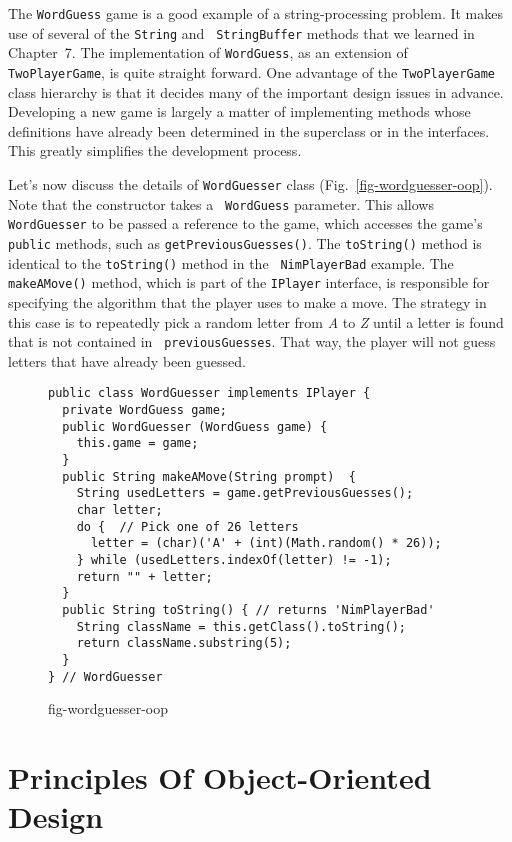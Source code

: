 The {\tt WordGuess} game is a good example of a string-processing
problem.  It makes use of several of the {\tt String} and {\tt
StringBuffer} methods that we learned in Chapter~7.  The
implementation of {\tt WordGuess}, as an extension of {\tt
TwoPlayerGame}, is quite straight forward. One advantage of
the {\tt TwoPlayerGame} class hierarchy is that it decides many
of the important design issues in advance. Developing a new game
is largely a matter of implementing methods whose definitions have
already been determined in the superclass or in the interfaces.  This
greatly simplifies the development process.

Let's now discuss the details of {\tt WordGuesser} class
(Fig.~\ref{fig-wordguesser-oop}). Note that the constructor takes a {\tt
WordGuess} parameter. This allows {\tt WordGuesser} to be passed a
reference to the game, which accesses the game's {\tt public}
methods, such as {\tt getPreviousGuesses()}.  The {\tt toString()}
method is identical to the {\tt toString()} method in the {\tt
NimPlayerBad} example.  The {\tt makeAMove()} method, which is part of
the {\tt IPlayer} interface, is responsible for specifying the
algorithm that the player uses to make a move.  The strategy in this
case is to repeatedly pick a random letter from {\em A} to {\em Z}
until a letter is found that is not contained in {\tt
previousGuesses}.  That way, the player will not guess letters that
have already been guessed. 

\begin{figure}[t]
\jjjprogstart
\begin{jjjlisting}
\begin{lstlisting}
public class WordGuesser implements IPlayer {   
  private WordGuess game;
  public WordGuesser (WordGuess game) {   
    this.game = game;
  }
  public String makeAMove(String prompt)  {   
    String usedLetters = game.getPreviousGuesses();
    char letter;
    do {  // Pick one of 26 letters
      letter = (char)('A' + (int)(Math.random() * 26));
    } while (usedLetters.indexOf(letter) != -1);
    return "" + letter;
  }
  public String toString() { // returns 'NimPlayerBad'
    String className = this.getClass().toString(); 
    return className.substring(5);        
  }
} // WordGuesser
\end{lstlisting}
\end{jjjlisting}
{fig-wordguesser-oop}
\end{figure}

\section{Principles Of Object-Oriented Design}
\label{principles-of-object-oriented-design}

